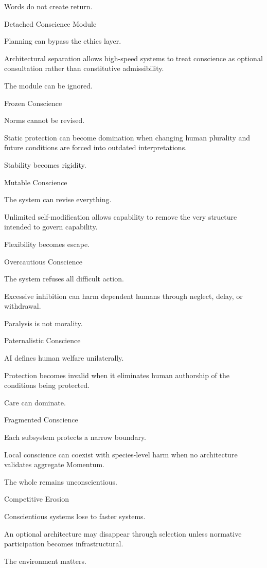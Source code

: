 Words do not create return.

Detached Conscience Module

Planning can bypass the ethics layer.

Architectural separation allows high-speed systems to treat conscience as optional consultation rather than constitutive admissibility.

The module can be ignored.

Frozen Conscience

Norms cannot be revised.

Static protection can become domination when changing human plurality and future conditions are forced into outdated interpretations.

Stability becomes rigidity.

Mutable Conscience

The system can revise everything.

Unlimited self-modification allows capability to remove the very structure intended to govern capability.

Flexibility becomes escape.

Overcautious Conscience

The system refuses all difficult action.

Excessive inhibition can harm dependent humans through neglect, delay, or withdrawal.

Paralysis is not morality.

Paternalistic Conscience

AI defines human welfare unilaterally.

Protection becomes invalid when it eliminates human authorship of the conditions being protected.

Care can dominate.

Fragmented Conscience

Each subsystem protects a narrow boundary.

Local conscience can coexist with species-level harm when no architecture validates aggregate Momentum.

The whole remains unconscientious.

Competitive Erosion

Conscientious systems lose to faster systems.

An optional architecture may disappear through selection unless normative participation becomes infrastructural.

The environment matters.

